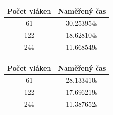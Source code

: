 \documentclass[12pt]{article}
\begin{document}
\begin{table}[H]
\parbox{.45\linewidth}{
%
%
\begin{center}
\begin{tabular}{ c | c }
\textbf{Počet vláken} & \textbf{Naměřený čas} \\ \hline \hline 
61 & 30.253954s \\ \hline
122 & 18.628104s \\ \hline
244 & 11.668549s \\ \hline
\end{tabular}
\end{center}
} 
\hfill
%
%
\parbox{.45\linewidth}{
\begin{center}
\begin{tabular}{ c | c }
\textbf{Počet vláken} & \textbf{Naměřený čas} \\ \hline \hline 
61 & 28.133410s \\ \hline
122 & 17.696219s \\ \hline
244 & 11.387652s \\ \hline
\end{tabular}
\end{center}}
\end{table}
\end{document}
